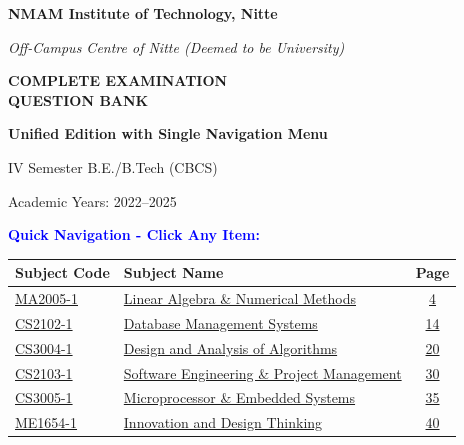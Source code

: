 \documentclass[11pt,a4paper]{article}
\begin{document}
\begin{titlepage}
\centering
\vspace*{1.5cm}
{\Huge\bfseries NMAM Institute of Technology, Nitte\par}
\vspace{0.5cm}
{\Large\itshape Off-Campus Centre of Nitte (Deemed to be University)\par}
\vspace{2cm}
{\Huge\bfseries COMPLETE EXAMINATION\\QUESTION BANK\par}
\vspace{0.5cm}
{\large\bfseries Unified Edition with Single Navigation Menu\par}
\vspace{1cm}
{\Large IV Semester B.E./B.Tech (CBCS)\par}
\vspace{0.5cm}
{\Large Academic Years: 2022--2025\par}
\vspace{1.5cm}

{\Large\bfseries\textcolor{blue}{Quick Navigation - Click Any Item:}\par}
\vspace{0.8cm}

\begin{tabular}{|p{3.5cm}|p{8cm}|c|}
\hline
\textbf{Subject Code} & \textbf{Subject Name} & \textbf{Page} \\
\hline
\hyperlink{section.1}{MA2005-1} & \hyperlink{section.1}{Linear Algebra \& Numerical Methods} & \hyperlink{section.1}{4} \\
\hline
\hyperlink{section.2}{CS2102-1} & \hyperlink{section.2}{Database Management Systems} & \hyperlink{section.2}{14} \\
\hline
\hyperlink{section.3}{CS3004-1} & \hyperlink{section.3}{Design and Analysis of Algorithms} & \hyperlink{section.3}{20} \\
\hline
\hyperlink{section.4}{CS2103-1} & \hyperlink{section.4}{Software Engineering \& Project Management} & \hyperlink{section.4}{30} \\
\hline
\hyperlink{section.5}{CS3005-1} & \hyperlink{section.5}{Microprocessor \& Embedded Systems} & \hyperlink{section.5}{35} \\
\hline
\hyperlink{section.6}{ME1654-1} & \hyperlink{section.6}{Innovation and Design Thinking} & \hyperlink{section.6}{40} \\
\hline
\end{tabular}


\end{titlepage}
\end{document}
